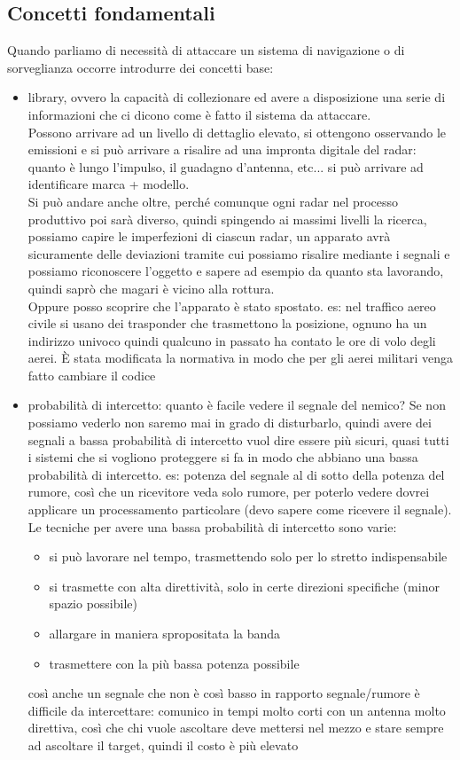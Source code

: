 \documentclass[oneside, 12pt]{extbook}
\begin{document}
\subsection{Concetti fondamentali}
Quando parliamo di necessità di attaccare un sistema di navigazione o di sorveglianza occorre introdurre dei concetti base:
\begin{itemize}
	\item library, ovvero la capacità di collezionare ed avere a disposizione una serie di informazioni che ci dicono come è fatto il sistema da attaccare.
	\\Possono arrivare ad un livello di dettaglio elevato, si ottengono osservando le emissioni e si può arrivare a risalire ad una impronta digitale del radar: quanto è lungo l'impulso, il guadagno d'antenna, etc... si può arrivare ad identificare marca + modello.
	\\Si può andare anche oltre, perché comunque ogni radar nel processo produttivo poi sarà diverso, quindi spingendo ai massimi livelli la ricerca, possiamo capire le imperfezioni di ciascun radar, un apparato avrà sicuramente delle deviazioni tramite cui possiamo risalire mediante i segnali e possiamo riconoscere l'oggetto e sapere ad esempio da quanto sta lavorando, quindi saprò che magari è vicino alla rottura.
	\\Oppure posso scoprire che l'apparato è stato spostato. es: nel traffico aereo civile si usano dei trasponder che trasmettono la posizione, ognuno ha un indirizzo univoco quindi qualcuno in passato ha contato le ore di volo degli aerei. È stata modificata la normativa in modo che per gli aerei militari venga fatto cambiare il codice
	\item probabilità di intercetto: quanto è facile vedere il segnale del nemico? Se non possiamo vederlo non saremo mai in grado di disturbarlo, quindi avere dei segnali a bassa probabilità di intercetto vuol dire essere più sicuri, quasi tutti i sistemi che si vogliono proteggere si fa in modo che abbiano una bassa probabilità di intercetto. es: potenza del segnale al di sotto della potenza del rumore, così che un ricevitore veda solo rumore, per poterlo vedere dovrei applicare un processamento particolare (devo sapere come ricevere il segnale).
	\\Le tecniche per avere una bassa probabilità di intercetto sono varie:
	\begin{itemize}
		\item si può lavorare nel tempo, trasmettendo solo per lo stretto indispensabile
		\item si trasmette con alta direttività, solo in certe direzioni specifiche (minor spazio possibile)
		\item allargare in maniera spropositata la banda
		\item trasmettere con la più bassa potenza possibile
	\end{itemize}
	così anche un segnale che non è così basso in rapporto segnale/rumore è difficile da intercettare: comunico in tempi molto corti con un antenna molto direttiva, così che chi vuole ascoltare deve mettersi nel mezzo e stare sempre ad ascoltare il target, quindi il costo è più elevato
\end{itemize}
\end{document}
